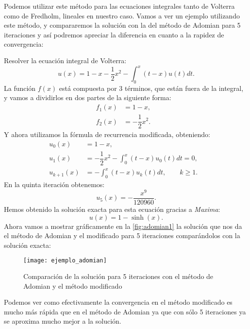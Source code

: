Podemos utilizar este método para las ecuaciones integrales tanto de Volterra como de Fredholm, lineales en nuestro caso. Vamos a ver un ejemplo utilizando este método, y compararemos la solución con la del método de Adomian para 5 iteraciones y así podremos apreciar la diferencia en cuanto a la rapidez de convergencia:

\begin{ejemplo}
	Resolver la ecuación integral de Volterra:
	\begin{equation}
		u(x) = 1 -x-\dfrac{1}{2}x^2 - \int_{0}^{x}(t-x) u(t)dt.
	\end{equation}
	La función $f(x)$ está compuesta por 3 términos, que están fuera de la integral, y vamos a dividirlos en dos partes de la siguiente forma:
	\begin{align}
		f_1(x) &= 1 -x,      &   \\
		f_2(x) &=-\dfrac{1}{2}x^2.    &
	\end{align}
	Y ahora utilizamos la fórmula de recurrencia modificada, obteniendo:
	\begin{align}
		u_0(x) &=  1 -x,      &   \\
		u_{1}(x) &=-\dfrac{1}{2}x^2 - \int_{0}^{x}(t-x) u_0(t)dt = 0,    &  \\
		u_{k+1}(x) &= - \int_{0}^{x}(t-x) u_k(t)dt, \qquad k \geqslant 1.    &
	\end{align}
	En la quinta iteración obtenemos:
	\begin{equation}
		u_5(x)=-\dfrac{x^9}{120960}.
	\end{equation}
	Hemos obtenido la solución exacta para esta ecuación gracias a \textit{Maxima}:
	\begin{equation}
		u(x) = 1 - \sinh(x).
	\end{equation}
	Ahora vamos a mostrar gráficamente en la \autoref{fig:adomian1} la solución que nos da el método de Adomian y el modificado para 5 iteraciones comparándolos con la solución exacta:
	\begin{figure}[h!]
		\centering
		\texttt{[image: ejemplo\_adomian]}
		\caption{Comparación de la solución para 5 iteraciones con el método de Adomian y el método modificado}
		\label{fig:adomian1}
	\end{figure}
	\begin{observacion}
		Podemos ver como efectivamente la convergencia en el método modificado es mucho más rápida que en el método de Adomian ya que con sólo 5 iteraciones ya se aproxima mucho mejor a la solución.
\end{observacion}
\end{ejemplo}

